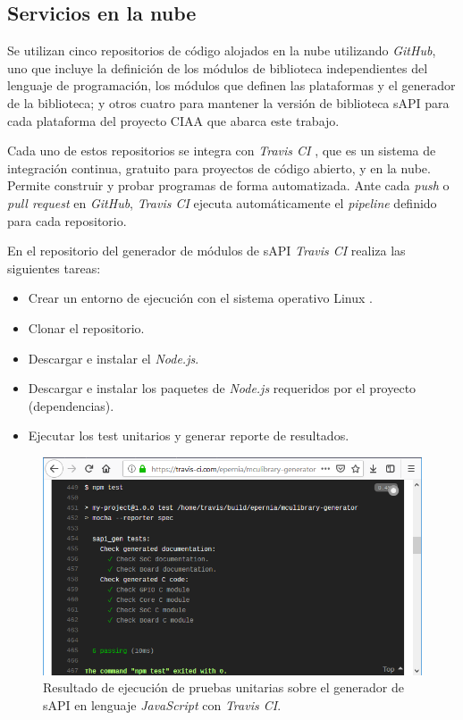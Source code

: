 \subsection{Servicios en la nube}

Se utilizan cinco repositorios de código alojados en la nube utilizando \emph{GitHub}, uno que incluye la definición de los módulos de biblioteca independientes del lenguaje de programación, los módulos que definen las plataformas y el generador de la biblioteca; y otros cuatro para mantener la versión de biblioteca sAPI para cada plataforma del proyecto CIAA que abarca este trabajo.

Cada uno de estos repositorios se integra con \emph{Travis CI} \citep{TravisCI}, que es un sistema de integración continua, gratuito para proyectos de código abierto, y en la nube. Permite construir y probar programas de forma automatizada. Ante cada \emph{push} o \emph{pull request} en \emph{GitHub}, \emph{Travis CI} ejecuta automáticamente el \emph{pipeline} definido para cada repositorio. 

En el repositorio del generador de módulos de sAPI \emph{Travis CI} realiza las siguientes tareas:

\begin{itemize}
\item
Crear un entorno de ejecución con el sistema operativo Linux \citep{GNULINUX}.
\item
Clonar el repositorio.
\item
Descargar e instalar el \emph{Node.js}.
\item
Descargar e instalar los paquetes de \emph{Node.js} requeridos por el proyecto (dependencias).
\item
Ejecutar los test unitarios y generar reporte de resultados.
\end{itemize}

\begin{figure}[!htbp]
\begin{center}  %
\includegraphics*[width=14cm]{Figures/TravisMochaChaiTests.png}
\par\caption{Resultado de ejecución de pruebas unitarias sobre el generador de sAPI en lenguaje \emph{JavaScript} con \emph{Travis CI}.}\label{fig:testTravisJS}
\end{center}
\end{figure}

